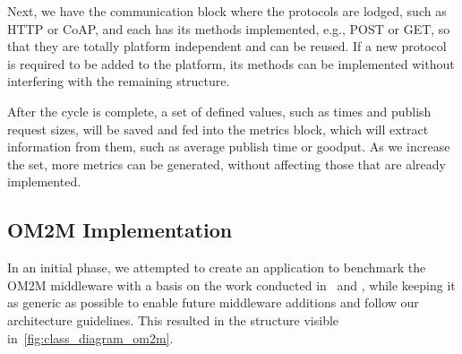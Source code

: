 \documentclass[conference]{IEEEtran}
\begin{document}
Next, we have the communication block where the protocols are lodged, such as HTTP or CoAP, and each has its methods implemented, e.g., POST or GET, so that they are totally platform independent and can be reused. If a new protocol is required to be added to the platform, its methods can be implemented without interfering with the remaining structure.

After the cycle is complete, a set of defined values, such as times and publish request sizes, will be saved and fed into the metrics block, which will extract information from them, such as average publish time or goodput. As we increase the set, more metrics can be generated, without affecting those that are already implemented. 

\subsection{OM2M Implementation}

In an initial phase, we attempted to create an application to benchmark the OM2M middleware with a basis on the work conducted in~\cite{pereira_benchmarking_2018} and \cite{cardoso_benchmarking_2017}, while keeping it as generic as possible to enable future middleware additions and follow our architecture guidelines. This resulted in the structure visible in~\ref{fig:class_diagram_om2m}.
\end{document}
